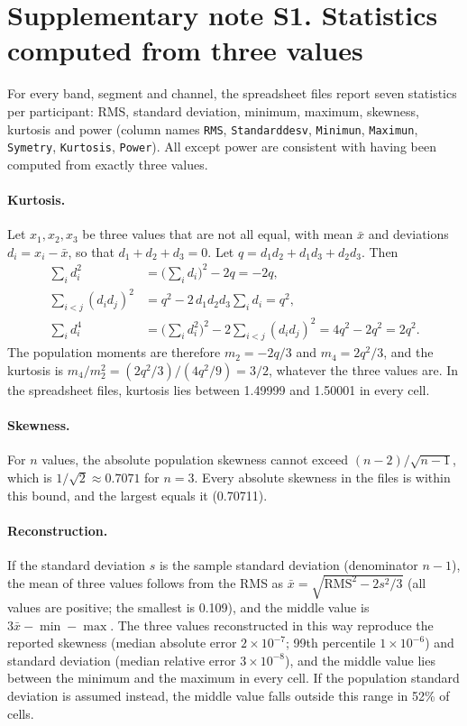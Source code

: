
\section*{Supplementary note S1. Statistics computed from three values}
\label{sec:suppnote1}

For every band, segment and channel, the spreadsheet files report seven statistics per participant: RMS, standard deviation, minimum, maximum, skewness, kurtosis and power (column names \texttt{RMS}, \texttt{Standarddesv}, \texttt{Minimun}, \texttt{Maximun}, \texttt{Symetry}, \texttt{Kurtosis}, \texttt{Power}). All except power are consistent with having been computed from exactly three values.

\paragraph{Kurtosis.} Let $x_1, x_2, x_3$ be three values that are not all equal, with mean $\bar{x}$ and deviations $d_i = x_i - \bar{x}$, so that $d_1 + d_2 + d_3 = 0$. Let $q = d_1 d_2 + d_1 d_3 + d_2 d_3$. Then
\begin{align*}
\sum_i d_i^2 &= \Big(\sum_i d_i\Big)^2 - 2q = -2q, \\
\sum_{i<j} (d_i d_j)^2 &= q^2 - 2\, d_1 d_2 d_3 \sum_i d_i = q^2, \\
\sum_i d_i^4 &= \Big(\sum_i d_i^2\Big)^2 - 2 \sum_{i<j} (d_i d_j)^2 = 4q^2 - 2q^2 = 2q^2 .
\end{align*}
The population moments are therefore $m_2 = -2q/3$ and $m_4 = 2q^2/3$, and the kurtosis is $m_4/m_2^2 = (2q^2/3)/(4q^2/9) = 3/2$, whatever the three values are. In the spreadsheet files, kurtosis lies between 1.49999 and 1.50001 in every cell.

\paragraph{Skewness.} For $n$ values, the absolute population skewness cannot exceed $(n-2)/\sqrt{n-1}$, which is $1/\sqrt{2} \approx 0.7071$ for $n = 3$. Every absolute skewness in the files is within this bound, and the largest equals it (0.70711).

\paragraph{Reconstruction.} If the standard deviation $s$ is the sample standard deviation (denominator $n-1$), the mean of three values follows from the RMS as $\bar{x} = \sqrt{\mathrm{RMS}^2 - 2s^2/3}$ (all values are positive; the smallest is 0.109), and the middle value is $3\bar{x} - \min - \max$. The three values reconstructed in this way reproduce the reported skewness (median absolute error $2 \times 10^{-7}$; 99th percentile $1 \times 10^{-6}$) and standard deviation (median relative error $3 \times 10^{-8}$), and the middle value lies between the minimum and the maximum in every cell. If the population standard deviation is assumed instead, the middle value falls outside this range in 52\% of cells.

